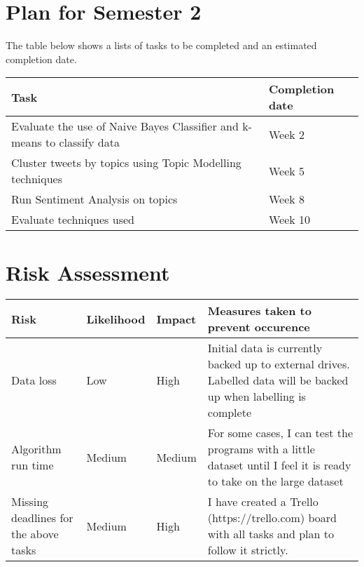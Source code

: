 
\chapter{Plan for Semester 2}
\label{cha:plansem2}

The table below shows a lists of tasks to be completed and an estimated completion date.

\begin{center}
  \begin{tabular}{| l | l |}
    \hline
    \textbf{Task} & \textbf{Completion date} \\ \hline
    Evaluate the use of Naive Bayes Classifier and k-means to classify data & Week 2 \\ \hline
    Cluster tweets by topics using Topic Modelling techniques & Week 5 \\ \hline
    Run Sentiment Analysis on topics & Week 8 \\ \hline
    Evaluate techniques used & Week 10 \\ \hline
  \end{tabular}
\end{center}


\chapter{Risk Assessment}
\label{cha:risk-assessment}

\begin{center}
  \begin{tabular}{| l | l | l | p{5cm} |}
    \hline
    \textbf{Risk} & \textbf{Likelihood} & \textbf{Impact} & \textbf{Measures taken to prevent occurence} \\ \hline
    Data loss & Low & High & Initial data is currently backed up to external drives. Labelled data
    will be backed up when labelling is complete \\ \hline

    Algorithm run time & Medium & Medium & For some cases, I can test the programs with a little
    dataset until I feel it is ready to take on the large dataset \\ \hline

    Missing deadlines for the above tasks & Medium & High & I have created a
    Trello (https://trello.com) board with all tasks and plan to follow it strictly. \\ \hline
  \end{tabular}
\end{center}
